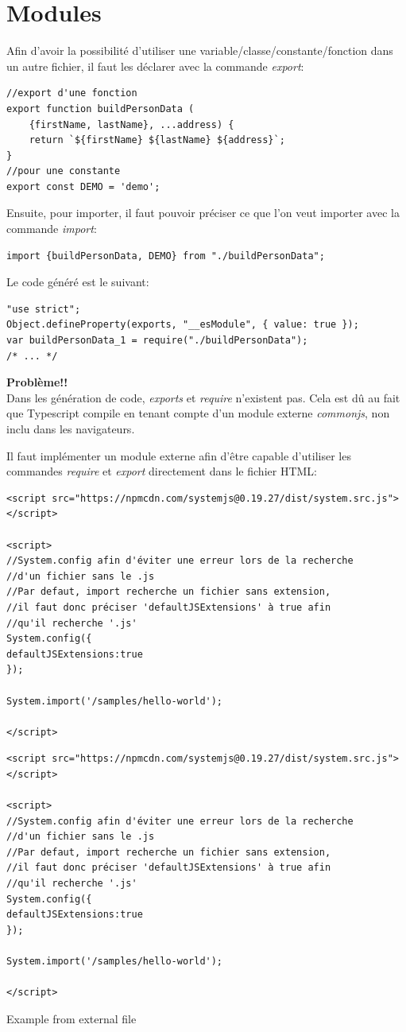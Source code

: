 \documentclass[12pt,oneside]{scrbook}
\begin{document}
\section{Modules}
Afin d'avoir la possibilité d'utiliser une variable/classe/constante/fonction dans un autre fichier, il faut les déclarer avec la commande \textit{export}:
\begin{verbatim}
//export d'une fonction
export function buildPersonData (
    {firstName, lastName}, ...address) {
    return `${firstName} ${lastName} ${address}`;
}
//pour une constante
export const DEMO = 'demo';
\end{verbatim}
Ensuite, pour importer, il faut pouvoir préciser ce que l'on veut importer avec la commande \textit{import}:
\begin{verbatim}
import {buildPersonData, DEMO} from "./buildPersonData";
\end{verbatim}
Le code généré est le suivant:
\begin{verbatim}
"use strict";
Object.defineProperty(exports, "__esModule", { value: true });
var buildPersonData_1 = require("./buildPersonData");
/* ... */
\end{verbatim}
\textbf{Problème!!}\\
Dans les génération de code, \textit{exports} et \textit{require} n'existent pas. Cela est dû au fait que Typescript compile en tenant compte d'un module externe \textit{commonjs}, non inclu dans les navigateurs.

Il faut implémenter un module externe afin d'être capable d'utiliser les commandes \textit{require} et \textit{export} directement dans le fichier HTML:
\begin{verbatim}
<script src="https://npmcdn.com/systemjs@0.19.27/dist/system.src.js">
</script>

<script>
//System.config afin d'éviter une erreur lors de la recherche 
//d'un fichier sans le .js
//Par defaut, import recherche un fichier sans extension,
//il faut donc préciser 'defaultJSExtensions' à true afin
//qu'il recherche '.js'
System.config({
defaultJSExtensions:true
});

System.import('/samples/hello-world');

</script>
\end{verbatim}
\begin{listing}[ht]
\begin{verbatim}
<script src="https://npmcdn.com/systemjs@0.19.27/dist/system.src.js">
</script>

<script>
//System.config afin d'éviter une erreur lors de la recherche 
//d'un fichier sans le .js
//Par defaut, import recherche un fichier sans extension,
//il faut donc préciser 'defaultJSExtensions' à true afin
//qu'il recherche '.js'
System.config({
defaultJSExtensions:true
});

System.import('/samples/hello-world');

</script>
\end{verbatim}
\caption{Example from external file}
\label{listing:0}
\end{listing}
\end{document}
